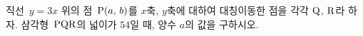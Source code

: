 직선~$y=3x$ 위의 점~$\mathrm{P}(a,\,b)$를 $x$축, $y$축에 대하여 대칭이동한 점을 각각 $\mathrm{Q}$, $\mathrm{R}$라 하자. 삼각형~$\mathrm{PQR}$의 넓이가 $54$일 때, 양수 $a$의 값을 구하시오.
